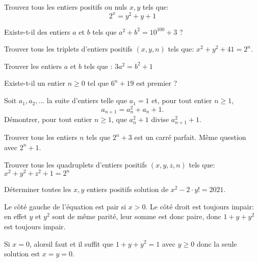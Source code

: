 \smallskip


\begin{exo}
Trouvez tous les entiers positifs ou nuls $x,y$ tels que:
 $$2^x=y^2+y+1$$
\end{exo}


\begin{exo}
Existe-t-il des entiers $a$ et $b$ tels que $a^2 + b^2 = 10^{100} + 3$ ?
\end{exo}


\begin{exo} Trouver tous les triplets d'entiers positifs $(x,y,n)$ tels que:
$x^2+y^2+41=2^n$.
\end{exo}


\begin{exo}
Trouver les entiers $a$ et $b$ tels que : $3a^2=b^2+1$
\end{exo}


\begin{exo}
Existe-t-il un entier $n\ge 0$ tel que $6^n+19$ est premier ?
\end{exo}


\begin{exo}
Soit $a_1,a_2,\ldots$ la suite d'entiers telle que $a_1 = 1$ et,
pour tout entier $n \ge 1$,
\[a_{n+1} = a_n^2+a_n+1.\]
Démontrer, pour tout entier $n \ge 1$, que
$a_n^2+1$ divise $a_{n+1}^2+1$.
\end{exo}


\begin{exo}
Trouver tous les entiers $n$ tels que $2^n + 3$ est un carré parfait. Même question avec $2^n + 1$.
\end{exo}


\begin{exo} Trouver tous les quadruplets d'entiers positifs $(x,y,z,n)$ tels que: $x^2+y^2+z^2+1=2^n$
\end{exo}


\begin{exo}
Déterminer toutes les $x,y$ entiers positifs solution de $x^2-2\cdot y!=2021$.
\end{exo}


\begin{sol}
Le côté gauche de l'équation est pair si $x>0$. Le côté droit est toujours impair: en effet $y$ et $y^2$ sont de même parité, leur somme est donc paire, donc $1+y+y^2$ est toujours impair.

\smallskip

Si $x=0$, alorsil faut et il suffit que $1+y+y^2=1$ avec $y\ge 0$ donc la seule solution est $x=y=0$.
\end{sol}


